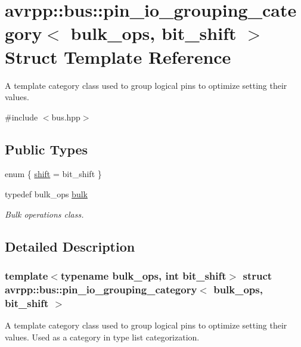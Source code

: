 \hypertarget{structavrpp_1_1bus_1_1pin__io__grouping__category}{
\section{avrpp::bus::pin\_\-io\_\-grouping\_\-category$<$ bulk\_\-ops, bit\_\-shift $>$ Struct Template Reference}
\label{structavrpp_1_1bus_1_1pin__io__grouping__category}
}


A template category class used to group logical pins to optimize setting their values.  




{\ttfamily \#include $<$bus.hpp$>$}

\subsection*{Public Types}
\begin{DoxyCompactItemize}
\item 
enum \{ \hyperlink{structavrpp_1_1bus_1_1pin__io__grouping__category_af29145823ae396f458045a03f6a8a990a880849596426606916d1b706e0969ccd}{shift} = bit\_\-shift
 \}
\item 
typedef bulk\_\-ops \hyperlink{structavrpp_1_1bus_1_1pin__io__grouping__category_ab2cd4db2f1bcdfea4ac706704e264e3d}{bulk}
\begin{DoxyCompactList}\small\item\em Bulk operations class. \item\end{DoxyCompactList}\end{DoxyCompactItemize}


\subsection{Detailed Description}
\subsubsection*{template$<$typename bulk\_\-ops, int bit\_\-shift$>$ struct avrpp::bus::pin\_\-io\_\-grouping\_\-category$<$ bulk\_\-ops, bit\_\-shift $>$}

A template category class used to group logical pins to optimize setting their values. Used as a category in type list categorization. 

